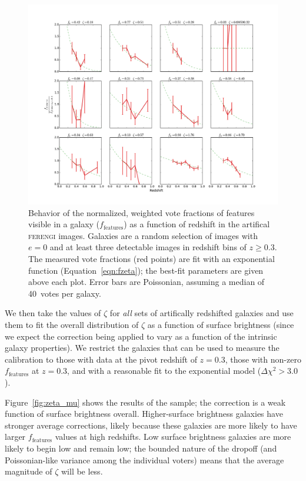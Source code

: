 \documentclass[usenatbib]{mn2e}
\newcommand{\ferengi}{\textsc{ferengi}}
\begin{document}
\begin{figure}
\begin{center}
\includegraphics[width=\textwidth]{figures/zeta_examples.pdf}
\caption{Behavior of the normalized, weighted vote fractions of features visible in a galaxy ($f_\textrm{features}$) as a function of redshift in the artifical \ferengi{} images. Galaxies are a random selection of images with $e=0$ and at least three detectable images in redshift bins of $z\ge0.3$. The measured vote fractions (red points) are fit with an exponential function (Equation~\ref{eqn:fzeta}); the best-fit parameters are given above each plot. Error bars are Poissonian, assuming a median of 40~votes per galaxy.}
\label{fig:zeta_examples}
\end{center}
\end{figure}

We then take the values of $\zeta$ for \emph{all} sets of artifically redshifted galaxies and use them to fit the overall distribution of $\zeta$ as a function of surface brightness (since we expect the correction being applied to vary as a function of the intrinsic galaxy properties). We restrict the galaxies that can be used to measure the calibration to those with data at the pivot redshift of $z=0.3$, those with non-zero $f_\textrm{features}$ at $z=0.3$, and with a reasonable fit to the exponential model ($\Delta \chi^2 > 3.0$). 

Figure~\ref{fig:zeta_mu} shows the results of the sample; the correction is a weak function of surface brightness overall. Higher-surface brightness galaxies have stronger average corrections, likely because these galaxies are more likely to have larger $f_\textrm{features}$ values at high redshifts. Low surface brightness galaxies are more likely to begin low and remain low; the bounded nature of the dropoff (and Poissonian-like variance among the individual voters) means that the average magnitude of $\zeta$ will be less. 
\end{document}
